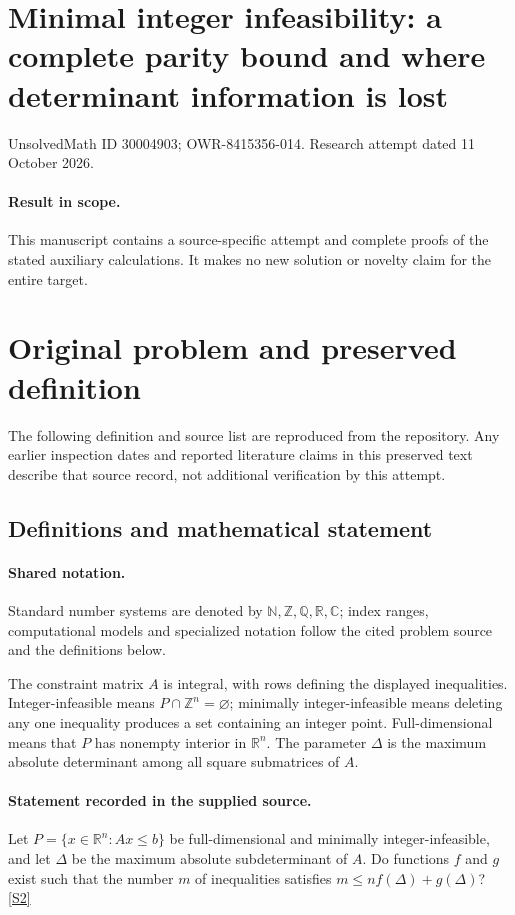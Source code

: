 \documentclass[11pt]{article}
\begin{document}
\section*{Minimal integer infeasibility: a complete parity bound and where determinant information is lost}
\noindent UnsolvedMath ID 30004903; OWR-8415356-014. Research attempt dated 11 October 2026.
\paragraph{Result in scope.}This manuscript contains a source-specific attempt and complete proofs of the stated auxiliary calculations. It makes no new solution or novelty claim for the entire target.
\section{Original problem and preserved definition}
The following definition and source list are reproduced from the repository. Any earlier inspection dates and reported literature claims in this preserved text describe that source record, not additional verification by this attempt.
\subsection{Definitions and mathematical statement}

\paragraph{Shared notation.}Standard number systems are denoted by $\mathbb N,\mathbb Z,\mathbb Q,\mathbb R,\mathbb C$; index ranges, computational models and specialized notation follow the cited problem source and the definitions below.


The constraint matrix $A$ is integral, with rows defining the displayed inequalities. Integer-infeasible means $P\cap\mathbb Z^n=\varnothing$; minimally integer-infeasible means deleting any one inequality produces a set containing an integer point. Full-dimensional means that $P$ has nonempty interior in $\mathbb R^n$. The parameter $\Delta$ is the maximum absolute determinant among all square submatrices of $A$.
\paragraph{Statement recorded in the supplied source.}
Let $P=\{x\in\mathbb R^n:Ax\leq b\}$ be full-dimensional and minimally integer-infeasible, and let $\Delta$ be the maximum absolute subdeterminant of $A$. Do functions $f$ and $g$ exist such that the number $m$ of inequalities satisfies $m\leq nf(\Delta)+g(\Delta)$? \href{https://doi.org/10.4171/owr/2021/53}{[S2]}
\end{document}

